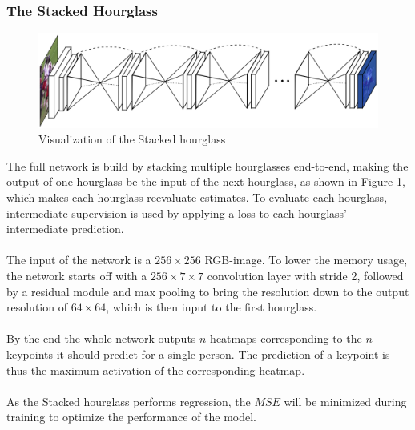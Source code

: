 \documentclass[./main.tex]{subfiles}
\begin{document}
\subsubsection{The Stacked Hourglass}
\begin{figure}[htbp]
    \centering
    \includegraphics[height = 4 cm]{entities/SHG.png}
    \caption{Visualization of the Stacked hourglass \cite{Newell}}
    \label{fig:SHG}
\end{figure}
\noindent The full network is build by stacking multiple hourglasses end-to-end, making the output of one hourglass be the input of the next hourglass, as shown in Figure \ref{fig:SHG}, which makes each hourglass reevaluate estimates. To evaluate each hourglass, intermediate supervision is used by applying a loss to each hourglass' intermediate prediction.
\\
\\
The input of the network is a $256 \times 256$ RGB-image. To lower the memory usage, the network starts off with a $256 \times 7 \times 7$ convolution layer with stride 2, followed by a residual module and max pooling to bring the resolution down to the output resolution of $64 \times 64$, which is then input to the first hourglass.
\\
\\
By the end the whole network outputs $n$ heatmaps corresponding to the $n$ keypoints it should predict for a single person. The prediction of a keypoint is thus the maximum activation of the corresponding heatmap.
\\
\\
As the Stacked hourglass performs regression, the $MSE$ will be minimized during training to optimize the performance of the model.
\end{document}
